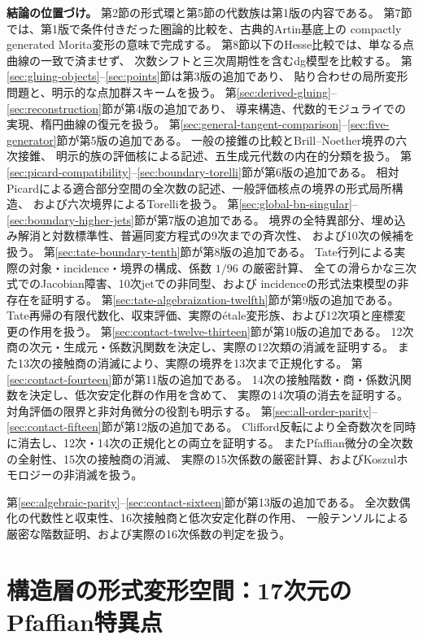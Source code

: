 \documentclass[a4paper,11pt]{ltjsarticle}
\theoremstyle{definition}
\begin{document}
\medskip
\noindent\textbf{結論の位置づけ。}
第2節の形式環と第5節の代数族は第1版の内容である。
第7節では、第1版で条件付きだった圏論的比較を、古典的Artin基底上の
compactly generated Morita変形の意味で完成する。
第8節以下のHesse比較では、単なる点曲線の一致で済ませず、
次数シフトと三次周期性を含むdg模型を比較する。
第\ref{sec:gluing-objects}--\ref{sec:points}節は第3版の追加であり、
貼り合わせの局所変形問題と、明示的な点加群スキームを扱う。
第\ref{sec:derived-gluing}--\ref{sec:reconstruction}節が第4版の追加であり、
導来構造、代数的モジュライでの実現、楕円曲線の復元を扱う。
第\ref{sec:general-tangent-comparison}--\ref{sec:five-generator}節が第5版の追加である。
一般の接錐の比較とBrill--Noether境界の六次接錐、
明示的族の評価核による記述、五生成元代数の内在的分類を扱う。
第\ref{sec:picard-compatibility}--\ref{sec:boundary-torelli}節が第6版の追加である。
相対Picardによる適合部分空間の全次数の記述、一般評価核点の境界の形式局所構造、
および六次境界によるTorelliを扱う。
第\ref{sec:global-bn-singular}--\ref{sec:boundary-higher-jets}節が第7版の追加である。
境界の全特異部分、埋め込み解消と対数標準性、普遍同変方程式の9次までの斉次性、
および10次の候補を扱う。
第\ref{sec:tate-boundary-tenth}節が第8版の追加である。
Tate行列による実際の対象・incidence・境界の構成、係数 $1/96$ の厳密計算、
全ての滑らかな三次式でのJacobian障害、10次jetでの非同型、および
incidenceの形式法束模型の非存在を証明する。
第\ref{sec:tate-algebraization-twelfth}節が第9版の追加である。
Tate再帰の有限代数化、収束評価、実際のétale変形族、および12次項と座標変更の作用を扱う。
第\ref{sec:contact-twelve-thirteen}節が第10版の追加である。
12次商の次元・生成元・係数汎関数を決定し、実際の12次類の消滅を証明する。
また13次の接触商の消滅により、実際の境界を13次まで正規化する。
第\ref{sec:contact-fourteen}節が第11版の追加である。
14次の接触階数・商・係数汎関数を決定し、低次安定化群の作用を含めて、
実際の14次項の消去を証明する。対角評価の限界と非対角微分の役割も明示する。
第\ref{sec:all-order-parity}--\ref{sec:contact-fifteen}節が第12版の追加である。
Clifford反転により全奇数次を同時に消去し、12次・14次の正規化との両立を証明する。
またPfaffian微分の全次数の全射性、15次の接触商の消滅、
実際の15次係数の厳密計算、およびKoszulホモロジーの非消滅を扱う。

第\ref{sec:algebraic-parity}--\ref{sec:contact-sixteen}節が第13版の追加である。
全次数偶化の代数性と収束性、16次接触商と低次安定化群の作用、
一般テンソルによる厳密な階数証明、および実際の16次係数の判定を扱う。




\section{構造層の形式変形空間：17次元のPfaffian特異点}
\end{document}
